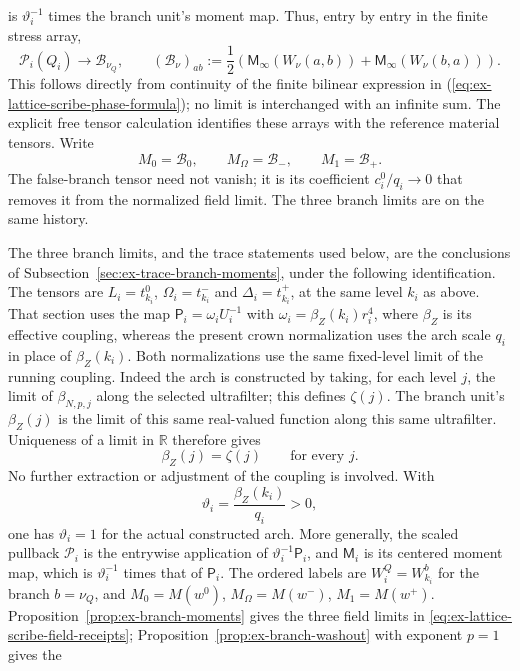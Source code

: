 is $\vartheta_i^{-1}$ times the branch unit's moment map. Thus, entry by
entry in the finite
stress array,
\[
 \mathcal P_i(Q_i)\longrightarrow\mathcal B_{\nu_Q},\qquad
 (\mathcal B_\nu)_{ab}:=
 \frac12\left(\mathsf M_\infty(W_\nu(a,b))+
                \mathsf M_\infty(W_\nu(b,a))\right).
\]
This follows directly from continuity of the finite bilinear expression in
(\ref{eq:ex-lattice-scribe-phase-formula}); no limit is interchanged with
an infinite sum. The explicit free tensor calculation identifies these
arrays with the reference material tensors. Write
\[
 M_0=\mathcal B_0,\qquad M_\Omega=\mathcal B_-,\qquad M_1=\mathcal B_+.
\]
The false-branch tensor need not vanish; it is its coefficient
$c_i^0/q_i\to0$ that removes it from the normalized field limit. The three
branch limits are on the same history.

The three branch limits, and the trace statements used below, are the
conclusions of Subsection~\ref{sec:ex-trace-branch-moments}, under the following
identification. The tensors are $L_i=t^0_{k_i}$, $\Omega_i=t^-_{k_i}$
and $\Delta_i=t^+_{k_i}$, at the same level $k_i$ as above. That
section uses the map $\mathsf P_i=\omega_iU_i^{-1}$ with
$\omega_i=\beta_Z(k_i)r_i^4$, where $\beta_Z$ is its effective coupling,
whereas the present crown normalization uses the arch scale $q_i$ in
place of $\beta_Z(k_i)$. Both normalizations use the same fixed-level
limit of the running coupling. Indeed the arch is constructed by taking,
for each level $j$, the limit of $\beta_{N,p,j}$ along the selected
ultrafilter; this defines $\zeta(j)$. The branch unit's $\beta_Z(j)$ is
the limit of this same real-valued function along this same ultrafilter.
Uniqueness of a limit in $\mathbb R$ therefore gives
\begin{equation}\label{eq:scribe-same-arch}
                  \beta_Z(j)=\zeta(j)\qquad\text{for every }j.
\end{equation}
No further extraction or adjustment of the coupling is involved. With
\[
 \vartheta_i=\frac{\beta_Z(k_i)}{q_i}>0,
\]
one has $\vartheta_i=1$ for the actual constructed arch. More generally,
the scaled pullback $\mathcal P_i$ is the entrywise application of
$\vartheta_i^{-1}\mathsf P_i$, and $\mathsf M_i$ is its centered moment
map, which is $\vartheta_i^{-1}$ times that of $\mathsf P_i$. The
ordered labels are $W_i^Q=W^{b}_{k_i}$ for the branch $b=\nu_Q$, and
$M_0=M(w^0)$, $M_\Omega=M(w^-)$, $M_1=M(w^+)$.
Proposition~\ref{prop:ex-branch-moments} gives the three field limits in
\eqref{eq:ex-lattice-scribe-field-receipts};
Proposition~\ref{prop:ex-branch-washout} with exponent $p=1$ gives the

